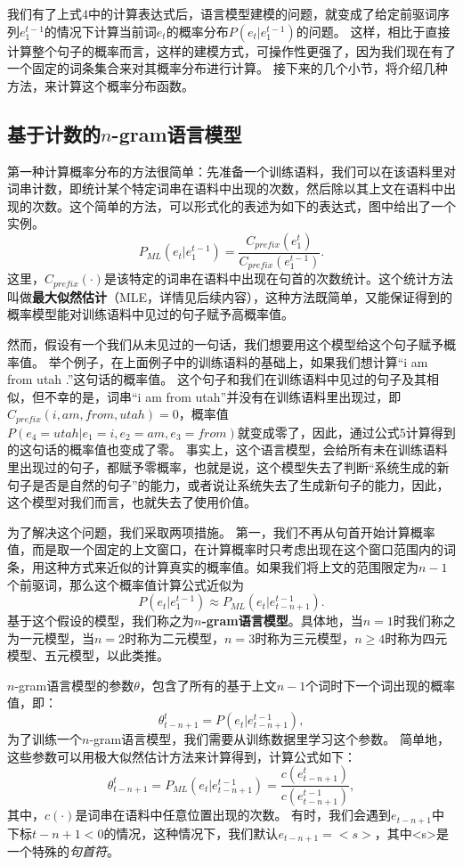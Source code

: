 \documentclass[10pt,a4paper]{ctexart}
\begin{document}
我们有了上式4中的计算表达式后，语言模型建模的问题，就变成了给定前驱词序列$e_1^{t-1}$的情况下计算当前词$e_t$的概率分布$P(e_t|e_1^{t-1})$的问题。
这样，相比于直接计算整个句子的概率而言，这样的建模方式，可操作性更强了，因为我们现在有了一个固定的词条集合来对其概率分布进行计算。
接下来的几个小节，将介绍几种方法，来计算这个概率分布函数。


\subsection{基于计数的$n$-gram语言模型}
第一种计算概率分布的方法很简单：先准备一个训练语料，我们可以在该语料里对词串计数，即统计某个特定词串在语料中出现的次数，然后除以其上文在语料中出现的次数。这个简单的方法，可以形式化的表述为如下的表达式，图中给出了一个实例。
\[
  P_{ML}(e_t|e_1^{t-1})=\frac{C_{prefix}(e_1^t)}{C_{prefix}(e_1^{t-1})}.
\]
这里，$C_{prefix}(\cdot)$是该特定的词串在语料中出现在句首的次数统计。这个统计方法叫做\textbf{最大似然估计}（MLE，详情见后续内容），这种方法既简单，又能保证得到的概率模型能对训练语料中见过的句子赋予高概率值。

然而，假设有一个我们从未见过的一句话，我们想要用这个模型给这个句子赋予概率值。
举个例子，在上面例子中的训练语料的基础上，如果我们想计算“i am from utah .”这句话的概率值。
这个句子和我们在训练语料中见过的句子及其相似，但不幸的是，词串“i am from utah”并没有在训练语料里出现过，即$C_{prefix}(i,am,from,utah)=0$，概率值$P(e_4=utah|e_1=i,e_2=am,e_3=from)$就变成零了，因此，通过公式5计算得到的这句话的概率值也变成了零。
事实上，这个语言模型，会给所有未在训练语料里出现过的句子，都赋予零概率，也就是说，这个模型失去了判断“系统生成的新句子是否是自然的句子”的能力，或者说让系统失去了生成新句子的能力，因此，这个模型对我们而言，也就失去了使用价值。

为了解决这个问题，我们采取两项措施。
第一，我们不再从句首开始计算概率值，而是取一个固定的上文窗口，在计算概率时只考虑出现在这个窗口范围内的词条，用这种方式来近似的计算真实的概率值。如果我们将上文的范围限定为$n-1$个前驱词，那么这个概率值计算公式近似为
\[
  P(e_t|e_1^{t-1}) \approx P_{ML}(e_t|e_{t-n+1}^{t-1}).
\]
基于这个假设的模型，我们称之为\textbf{$n$-gram语言模型}。具体地，当$n=1$时我们称之为一元模型，当$n=2$时称为二元模型，$n=3$时称为三元模型，$n \geq 4$时称为四元模型、五元模型，以此类推。

$n$-gram语言模型的参数$\theta$，包含了所有的基于上文$n-1$个词时下一个词出现的概率值，即：
\[
  \theta_{t-n+1}^{t} = P(e_t | e_{t-n+1}^{t-1}),
\]
为了训练一个$n$-gram语言模型，我们需要从训练数据里学习这个参数。
简单地，这些参数可以用极大似然估计方法来计算得到，计算公式如下：
\[
  \theta_{t-n+1}^{t} = P_{ML}(e_t | e_{t-n+1}^{t-1}) = \frac{c(e_{t-n+1}^{t})}{c(e_{t-n+1}^{t-1})},
\]
其中，$c(\cdot)$是词串在语料中任意位置出现的次数。
有时，我们会遇到$e_{t-n+1}$中下标$t-n+1<0$的情况，这种情况下，我们默认$e_{t-n+1}=<s>$，其中<s>是一个特殊的\textit{句首符}。
\end{document}
